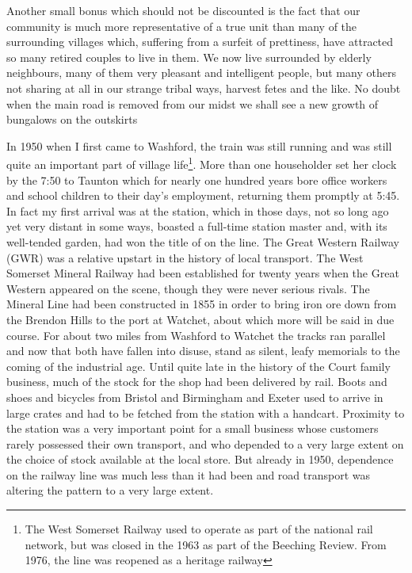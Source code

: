 Another small bonus which should not be discounted is the fact that our community is much more representative of a true unit than many of the surrounding villages which, suffering from a surfeit of prettiness, have attracted so many retired couples to live in them. We now live surrounded by elderly neighbours, many of them very pleasant and intelligent people, but many others not sharing at all in our strange tribal ways, harvest fetes and the like. No doubt when the main road is removed from our midst we shall see a new growth of bungalows on the outskirts

In 1950 when I first came to Washford, the train was still running and was still quite an important part of village life\footnote{The West Somerset Railway used to operate as part of the national rail network, but was closed in the 1963 as part of the Beeching Review. From 1976, the line was reopened as a heritage railway}. More than one householder set her clock by the 7:50 to Taunton which for nearly one hundred years bore office workers and school children to their day's employment, returning them promptly at 5:45. In fact my first arrival was at the station, which in those days, not so long ago yet very distant in some ways, boasted a full-time station master and, with its well-tended garden, had won the title of  on the line. The Great Western Railway (GWR) was a relative upstart in the history of local transport. The West Somerset Mineral Railway had been established for twenty years when the Great Western appeared on the scene, though they were never serious rivals. The Mineral Line had been constructed in 1855 in order to bring iron ore down from the Brendon Hills to the port at Watchet, about which more will be said in due course. For about two miles from Washford to Watchet the tracks ran parallel and now that both have fallen into disuse, stand as silent, leafy memorials to the coming of the industrial age. Until quite late in the history of the Court family business, much of the stock for the shop had been delivered by rail. Boots and shoes and bicycles from Bristol and Birmingham and Exeter used to arrive in large crates and had to be fetched from the station with a handcart. Proximity to the station was a very important point for a small business whose customers rarely possessed their own transport, and who depended to a very large extent on the choice of stock available at the local store. But already in 1950, dependence on the railway line was much less than it had been and road transport was altering the pattern to a very large extent.

